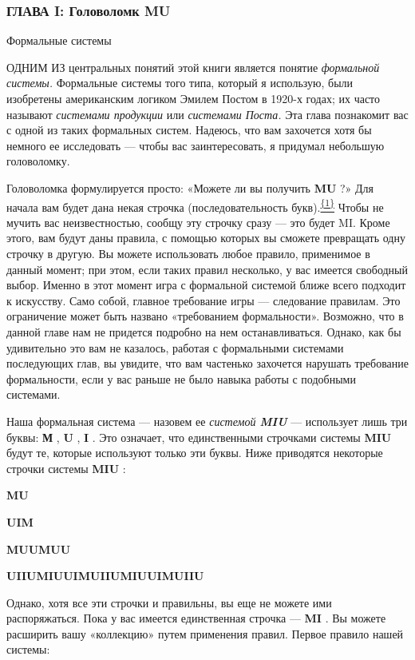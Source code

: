 \subsubsection{ГЛАВА I: Головоломк MU}

Формальные системы

ОДНИМ ИЗ центральных понятий этой книги является понятие \emph{формальной системы.} Формальные системы того типа, который я использую, были изобретены американским логиком Эмилем Постом в 1920-х годах; их часто называют \emph{системами продукции} или \emph{системами Поста.} Эта глава познакомит вас с одной из таких формальных систем. Надеюсь, что вам захочется хотя бы немного ее исследовать --- чтобы вас заинтересовать, я придумал небольшую головоломку.

Головоломка формулируется просто: «Можете ли вы получить \textbf{MU} ?» Для начала вам будет дана некая строчка (последовательность букв).\protect\hyperlink{c_1}{\textsuperscript{\uline{\{1\}}}} Чтобы не мучить вас неизвестностью, сообщу эту строчку сразу --- это будет MI. Кроме этого, вам будут даны правила, с помощью которых вы сможете превращать одну строчку в другую. Вы можете использовать любое правило, применимое в данный момент; при этом, если таких правил несколько, у вас имеется свободный выбор. Именно в этот момент игра с формальной системой ближе всего подходит к искусству. Само собой, главное требование игры --- следование правилам. Это ограничение может быть названо «требованием формальности». Возможно, что в данной главе нам не придется подробно на нем останавливаться. Однако, как бы удивительно это вам не казалось, работая с формальными системами последующих глав, вы увидите, что вам частенько захочется нарушать требование формальности, если у вас раньше не было навыка работы с подобными системами.

Наша формальная система --- назовем ее \emph{системой \textbf{MIU}} --- использует лишь три буквы: \textbf{М} , \textbf{U} , \textbf{I} . Это означает, что единственными строчками системы \textbf{MIU} будут те, которые используют только эти буквы. Ниже приводятся некоторые строчки системы \textbf{MIU} :

\textbf{MU}

\textbf{UIM}

\textbf{MUUMUU}

\textbf{UIIUMIUUIMUIIUMIUUIMUIIU}

Однако, хотя все эти строчки и правильны, вы еще не можете ими распоряжаться. Пока у вас имеется единственная строчка --- \textbf{MI} . Вы можете расширить вашу «коллекцию» путем применения правил. Первое правило нашей системы:

